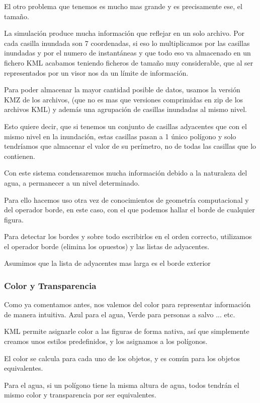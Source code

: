 El otro problema que tenemos es mucho mas grande y es precisamente ese, el
tamaño.

La simulación produce mucha información que reflejar en un solo archivo. Por
cada casilla inundada son 7 coordenadas, si eso lo multiplicamos por las
casillas inundadas y por el numero de instantáneas y que todo eso va almacenado
en un fichero KML acabamos teniendo ficheros de tamaño muy considerable, que al
ser representados por un visor nos da un límite de información.

Para poder almacenar la mayor cantidad posible de datos, usamos la versión KMZ
de los archivos, (que no es mas que versiones comprimidas en zip de los
archivos KML) y además una agrupación de casillas inundadas al mismo nivel.

Esto quiere decir, que si tenemos un conjunto de casillas adyacentes que con el
mismo nivel en la inundación, estas casillas pasan a 1 único polígono y solo
tendríamos que almacenar el valor de su perímetro, no de todas las casillas que
lo contienen.

Con este sistema condensaremos mucha información debido a la naturaleza del
agua, a permanecer a un nivel determinado.

Para ello hacemos uso otra vez de conocimientos de geometría computacional y
del operador borde, en este caso, con el que podemos hallar el borde de
cualquier figura.

Para detectar los bordes y sobre todo escribirlos en el orden correcto,
utilizamos el operador borde (elimina los opuestos) y las listas de adyacentes.

Asumimos que la lista de adyacentes mas larga es el borde exterior
\subsubsection*{Color y Transparencia}
Como ya comentamos antes, nos valemos del color para representar información de
manera intuitiva. Azul para el agua, Verde para personas a salvo ... etc.

KML permite asignarle color a las figuras de forma nativa, así que simplemente
creamos unos estilos predefinidos, y los asignamos a los polígonos.

El color se calcula para cada uno de los objetos, y es común para los objetos
equivalentes. 

Para el agua, si un polígono tiene la
misma altura de agua, todos tendrán el mismo color y transparencia por ser
equivalentes.

